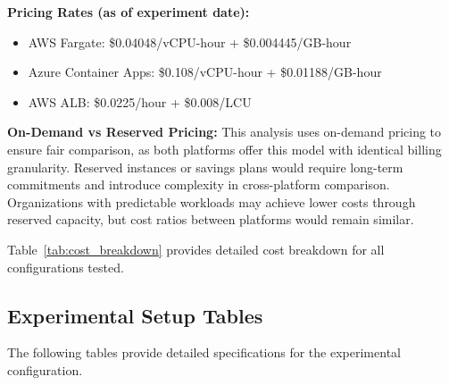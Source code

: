 \textbf{Pricing Rates (as of experiment date):}
\begin{itemize}
    \item AWS Fargate: \$0.04048/vCPU-hour + \$0.004445/GB-hour
    \item Azure Container Apps: \$0.108/vCPU-hour + \$0.01188/GB-hour  
    \item AWS ALB: \$0.0225/hour + \$0.008/LCU
\end{itemize}

\textbf{On-Demand vs Reserved Pricing:} This analysis uses on-demand pricing to ensure fair comparison, as both platforms offer this model with identical billing granularity. Reserved instances or savings plans would require long-term commitments and introduce complexity in cross-platform comparison. Organizations with predictable workloads may achieve lower costs through reserved capacity, but cost ratios between platforms would remain similar.

Table~\ref{tab:cost_breakdown} provides detailed cost breakdown for all configurations tested.

\subsection{Experimental Setup Tables}

The following tables provide detailed specifications for the experimental configuration.

